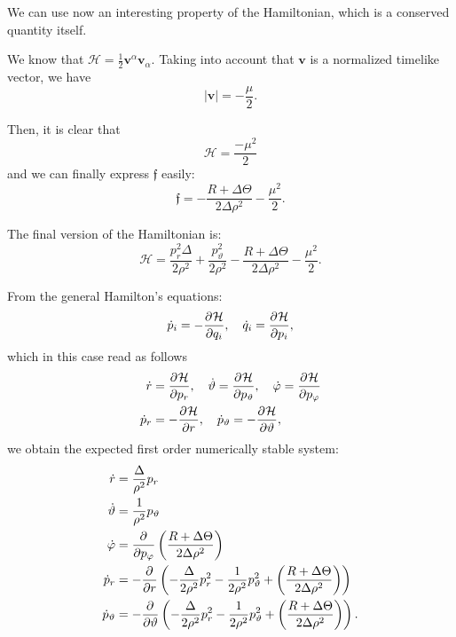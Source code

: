 We can use now an interesting property of the Hamiltonian, which is a conserved quantity itself.

We know that $\mathcal{H} = \frac{1}{2} \mathbf{v}^\alpha \mathbf{v}_\alpha$. Taking into account that $\mathbf{v}$ is a normalized timelike vector, we have
\[
	\vert \mathbf{v} \vert = - \frac{\mu}{2}.
\]

Then, it is clear that
\[
	\mathcal{H} = \frac{-\mu^2}{2}
\]
and we can finally express $\mathfrak{f}$ easily:
\[
	\mathfrak{f} = - \frac{R + \Delta \Theta}{2\Delta\rho^2} - \frac{\mu^2}{2}.
\]

The final version of the Hamiltonian is:
\begin{equation}
	\mathcal{H} = \frac{p_r^2 \Delta}{2\rho^2} + \frac{p_\vartheta^2}{2\rho^2} - \frac{R + \Delta \Theta}{2\Delta\rho^2} - \frac{\mu^2}{2}.
\end{equation}

From the general Hamilton's equations:
\[
	\dot{p}_i = -\frac{\partial^{} \mathcal{H}}{\partial q_i}, \quad \dot{q}_i = \frac{\partial^{} \mathcal{H}}{\partial p_i},
\]
which in this case read as follows
\begin{align*}
	\dot{r} &= \frac{\partial^{} \mathcal{H}}{\partial p_r}, \quad \dot{\vartheta} = \frac{\partial^{} \mathcal{H}}{\partial p_\vartheta}, \quad \dot{\varphi} = \frac{\partial^{} \mathcal{H}}{\partial p_\varphi} \\
	\dot{p}_r &= - \frac{\partial^{} \mathcal{H}}{\partial r}, \quad \dot{p}_\vartheta = - \frac{\partial^{} \mathcal{H}}{\partial \vartheta},
\end{align*}
we obtain the expected first order numerically stable system:
\begin{align}
	\dot{r} &= \frac{\Delta}{\rho^2} p_r \\
	\dot{\vartheta} &= \frac{1}{\rho^2}p_\vartheta \\
	\dot{\varphi} &= \frac{\partial^{} }{\partial p_\varphi}\left( \frac{R + \Delta\Theta}{2\Delta\rho^2} \right) \\
	\dot{p}_r &= - \frac{\partial^{} }{\partial r} \left( - \frac{\Delta}{2\rho^2}p_r^2 - \frac{1}{2\rho^2}p_\vartheta^2 + \left( \frac{R + \Delta\Theta}{2\Delta\rho^2} \right) \right) \\
	\dot{p}_\vartheta &= - \frac{\partial^{} }{\partial \vartheta} \left( - \frac{\Delta}{2\rho^2}p_r^2 - \frac{1}{2\rho^2}p_\vartheta^2 + \left( \frac{R + \Delta\Theta}{2\Delta\rho^2} \right) \right).
\end{align}